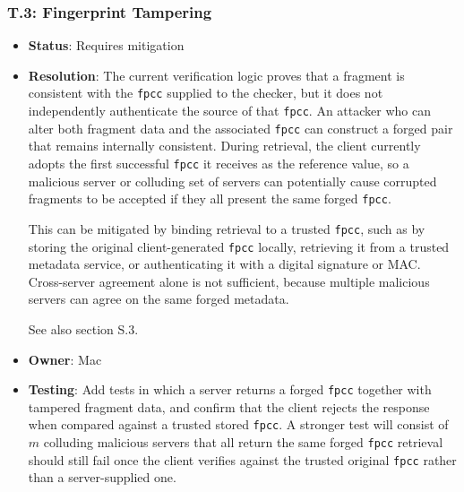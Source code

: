 \documentclass[../veristore_security_model.tex]{subfiles}
\begin{document}
\subsubsection{T.3: Fingerprint Tampering}
\begin{itemize}
    \item \textbf{Status}: Requires mitigation
    \item \textbf{Resolution}: The current verification logic proves that a fragment is consistent with the \texttt{fpcc} supplied to the checker, but it does not independently authenticate the source of that \texttt{fpcc}. An attacker who can alter both fragment data and the associated \texttt{fpcc} can construct a forged pair that remains internally consistent. During retrieval, the client currently adopts the first successful \texttt{fpcc} it receives as the reference value, so a malicious server or colluding set of servers can potentially cause corrupted fragments to be accepted if they all present the same forged \texttt{fpcc}. 
    
    This can be mitigated by binding retrieval to a trusted \texttt{fpcc}, such as by storing the original client-generated \texttt{fpcc} locally, retrieving it from a trusted metadata service, or authenticating it with a digital signature or MAC. Cross-server agreement alone is not sufficient, because multiple malicious servers can agree on the same forged metadata.

    See also section S.3.
    \item \textbf{Owner}: Mac
    \item \textbf{Testing}: Add tests in which a server returns a forged \texttt{fpcc} together with tampered fragment data, and confirm that the client rejects the response when compared against a trusted stored \texttt{fpcc}. A stronger test will consist of $m$ colluding malicious servers that all return the same forged \texttt{fpcc} \textendash{} retrieval should still fail once the client verifies against the trusted original \texttt{fpcc} rather than a server-supplied one.
\end{itemize}
\end{document}
